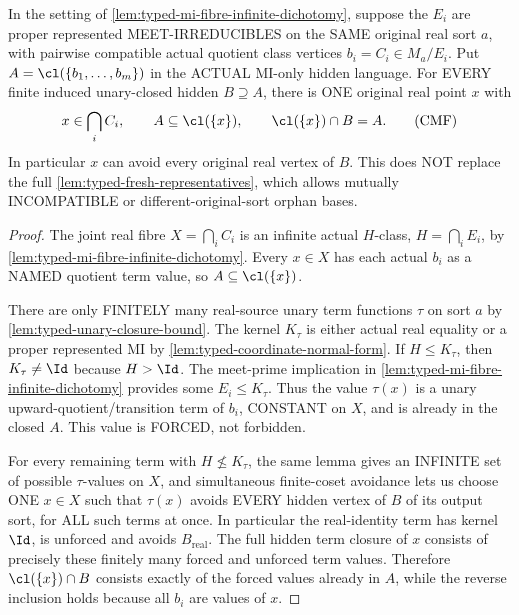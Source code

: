\begin{corollary}
\label{cor:typed-compatible-mi-single-real-frame}
In the setting of
\cref{lem:typed-mi-fibre-infinite-dichotomy},
suppose the $E_i$ are proper represented
MEET-IRREDUCIBLES on the SAME original
real sort $a$, with pairwise compatible
actual quotient class vertices
$b_i=C_i\in M_a/E_i$.
Put $A=\cl(\{b_1,\ldots,b_m\})$
in the ACTUAL MI-only hidden language.
For EVERY finite induced unary-closed
hidden $B\supseteq A$, there is ONE
original real point $x$ with
\[
   x\in\bigcap_i C_i,\qquad
   A\subseteq\cl(\{x\}),\qquad
   \cl(\{x\})\cap B=A.
 \tag{CMF}\label{eq:typed-compatible-mi-single-real-frame}
\]
In particular $x$ can avoid every
original real vertex of $B$.
This does NOT replace the full
\cref{lem:typed-fresh-representatives},
which allows mutually INCOMPATIBLE
or different-original-sort orphan bases.
\end{corollary}
\begin{proof}
The joint real fibre $X=\bigcap_i C_i$
is an infinite actual $H$-class,
$H=\bigcap_i E_i$, by
\cref{lem:typed-mi-fibre-infinite-dichotomy}.
Every $x\in X$ has each actual
$b_i$ as a NAMED quotient term
value, so
$A\subseteq\cl(\{x\})$.

There are only FINITELY many
real-source unary term functions
$\tau$ on sort $a$ by
\cref{lem:typed-unary-closure-bound}.
The kernel $K_\tau$ is either
actual real equality or a proper
represented MI by
\cref{lem:typed-coordinate-normal-form}.
If $H\le K_\tau$, then
$K_\tau\ne\Id$ because $H>\Id$.
The meet-prime implication
in \cref{lem:typed-mi-fibre-infinite-dichotomy}
provides some $E_i\le K_\tau$.
Thus the value $\tau(x)$ is
a unary upward-quotient/transition
term of $b_i$, CONSTANT on $X$,
and is already in the closed $A$.
This value is FORCED, not forbidden.

For every remaining term with
$H\nleq K_\tau$, the same lemma
gives an INFINITE set of possible
$\tau$-values on $X$, and
simultaneous finite-coset avoidance
lets us choose ONE $x\in X$
such that $\tau(x)$ avoids
EVERY hidden vertex of $B$
of its output sort, for ALL
such terms at once. In
particular the real-identity
term has kernel $\Id$, is
unforced and avoids $B_{\mathrm{real}}$.
The full hidden term closure
of $x$ consists of precisely
these finitely many forced and
unforced term values. Therefore
$\cl(\{x\})\cap B$ consists
exactly of the forced values
already in $A$, while the
reverse inclusion holds because
all $b_i$ are values of $x$.
\end{proof}

